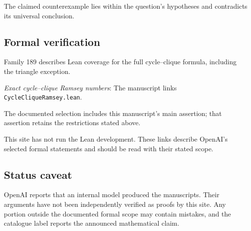 \documentclass[11pt]{article}
\begin{document}
The claimed counterexample lies within the question’s hypotheses and contradicts its universal conclusion.

\subsection{Formal verification}
Family 189 describes Lean coverage for the full cycle--clique formula, including the triangle exception.

\textit{Exact cycle--clique Ramsey numbers}: The manuscript links \texttt{CycleCliqueRamsey.lean}.

The documented selection includes this manuscript’s main assertion; that assertion retains the restrictions stated above.

This site has not run the Lean development. These links describe OpenAI’s selected formal statements and should be read with their stated scope.

\subsection{Status caveat}
OpenAI reports that an internal model produced the manuscripts. Their arguments have not been independently verified as proofs by this site. Any portion outside the documented formal scope may contain mistakes, and the catalogue label reports the announced mathematical claim.
\end{document}
